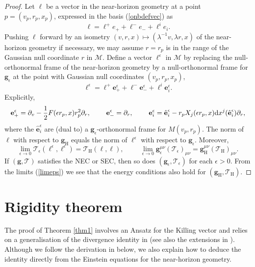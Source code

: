\documentclass[11pt, reqno]{amsart}
\theoremstyle{plain}
\theoremstyle{definition}
\numberwithin{equation}{section}
\begin{document}
\begin{proof}
    Let $\ell$ be a vector in the near-horizon geometry at a point $p = (v_p,r_p,x_p)$, expressed in the basis (\ref{onbdefvec}) as 
    \begin{equation*}
        \ell = \ell^+e_++\ell^-e_- + \ell^ie_i.
    \end{equation*}
    Pushing $\ell$ forward by an isometry $(v,r,x) \mapsto (\lambda^{-1}v,\lambda r,x)$ of the near-horizon geometry if necessary, we may assume $r = r_p$ is in the range of the Gaussian null coordinate $r$ in $\mathcal{M}$. Define a vector $\ell^\epsilon$ in $\mathcal{M}$ by replacing the null-orthonormal frame of the near-horizon geometry by a null-orthonormal frame for $\textbf{g}_\epsilon$ at the point with Gaussian null coordinates $(v_p,r_p,x_p)$,
        \begin{equation*}
        \ell^\epsilon = \ell^+\textbf{e}_{+}^\epsilon+\ell^-\textbf{e}_-^\epsilon + \ell^i\textbf{e}_i^\epsilon.
    \end{equation*}
Explicitly,
\begin{equation*}
    \textbf{e}_+^\epsilon = \partial_v - \frac 12F(\epsilon r_p,x)r_p^2\partial_r, \hspace{.8cm} \textbf{e}_-^\epsilon = \partial_r, \hspace{.8cm} \textbf{e}_i^\epsilon = \hat{\textbf{e}}_i^\epsilon - r_pX_j(\epsilon r_p,x)\text{d}x^j(\hat{\textbf{e}}_i^\epsilon)\partial_r,
\end{equation*}
where the $\hat{\textbf{e}}^\epsilon_i$ are (dual to) a $\textbf{g}_\epsilon$-orthonormal frame for $M(v_p,r_p)$. The norm of $\ell$ with respect to  $\textbf{g}_{\text{H}}$ equals the norm of $\ell^\epsilon$ with respect to $\textbf{g}_\epsilon$. Moreover,
\begin{equation} \label{limeps}
    \lim_{\epsilon \to 0}      \mathcal{T}_\epsilon(\ell^\epsilon,\ell^\epsilon) = \mathcal{T}_{\text{H}}(\ell,\ell), \hspace{1cm} \lim_{\epsilon \to 0}    \textbf{g}_\epsilon^{\mu\nu}(\mathcal{T}_\epsilon)_{\mu\nu} = \textbf{g}_{\text{H}}^{\mu\nu}(\mathcal{T}_\text{H})_{\mu\nu}.
\end{equation}
If $(\textbf{g},\mathcal{T})$ satisfies the NEC or SEC, then so does $(\textbf{g}_\epsilon,\mathcal{T}_\epsilon)$ for each $\epsilon > 0$. From the limits (\ref{limeps}) we see that the energy conditions also hold for $(\textbf{g}_{\text{H}},\mathcal{T}_{\text{H}})$.
\end{proof}
\section{Rigidity theorem} \label{rig}
The proof of Theorem \ref{thm1} involves an Ansatz for the Killing vector and relies on a generalisation of the divergence identity in \cite{DL} (see also the extensions in \cite{CKL, KL24, CD25}). Although we follow the derivation in \cite{DL} below, we also explain how to deduce the identity directly from the Einstein equations for the near-horizon geometry.
\end{document}
